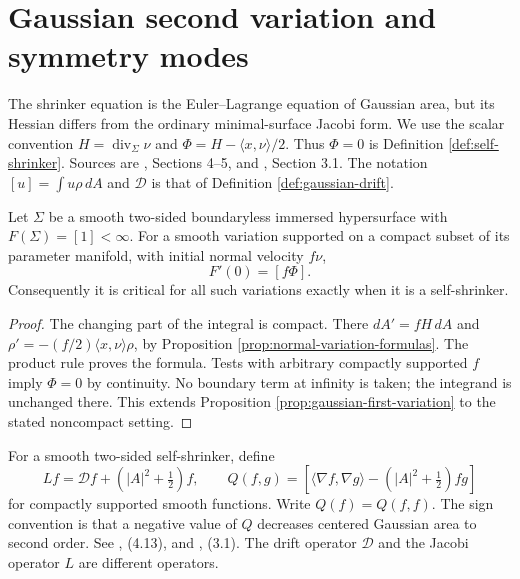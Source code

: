 \chapter{Gaussian second variation and symmetry modes}\label{sec:shrinker-variation}
The shrinker equation is the Euler--Lagrange equation of Gaussian area, but its Hessian differs from the ordinary minimal-surface Jacobi form. We use the scalar convention $H=\operatorname{div}_\Sigma\nu$ and $\Phi=H-\langle x,\nu\rangle/2$. Thus $\Phi=0$ is Definition \ref{def:self-shrinker}. Sources are \cite{CM12}, Sections 4--5, and \cite{CCMS20}, Section 3.1. The notation $[u]=\int u\rho\,dA$ and $\mathcal D$ is that of Definition \ref{def:gaussian-drift}.

\begin{proposition}\label{prop:gaussian-compact-variation}
Let $\Sigma$ be a smooth two-sided boundaryless immersed hypersurface with $F(\Sigma)=[1]<\infty$. For a smooth variation supported on a compact subset of its parameter manifold, with initial normal velocity $f\nu$,
\[
 F'(0)=[f\Phi].
\]
Consequently it is critical for all such variations exactly when it is a self-shrinker.
\end{proposition}
\begin{proof}
The changing part of the integral is compact. There $dA'=fH\,dA$ and $\rho'=-(f/2)\langle x,\nu\rangle\rho$, by Proposition \ref{prop:normal-variation-formulas}. The product rule proves the formula. Tests with arbitrary compactly supported $f$ imply $\Phi=0$ by continuity. No boundary term at infinity is taken; the integrand is unchanged there. This extends Proposition \ref{prop:gaussian-first-variation} to the stated noncompact setting.
\end{proof}

\begin{definition}\label{def:shrinker-jacobi}
For a smooth two-sided self-shrinker, define
\[
 Lf=\mathcal Df+(|A|^2+\tfrac12)f,
 \qquad Q(f,g)=[\langle\nabla f,\nabla g\rangle-(|A|^2+\tfrac12)fg]
\]
for compactly supported smooth functions. Write $Q(f)=Q(f,f)$. The sign convention is that a negative value of $Q$ decreases centered Gaussian area to second order. See \cite{CM12}, (4.13), and \cite{CCMS20}, (3.1). The drift operator $\mathcal D$ and the Jacobi operator $L$ are different operators.
\end{definition}

